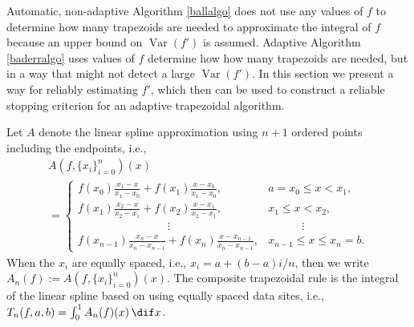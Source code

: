 \documentclass[]{article}
\DeclareMathOperator{\Var}{Var}
\theoremstyle{definition}
\theoremstyle{remark}
\newcommand{\datasites}{\{x_i\}_{i=0}^n}
\begin{document}
Automatic, non-adaptive Algorithm \ref{ballalgo} does not use any values of $f$ to determine how many trapezoids are needed to approximate the integral of $f$ because an upper bound on $\Var(f')$ is assumed.  Adaptive Algorithm \ref{baderralgo} uses values of $f$ determine how how many trapezoids are needed, but in a way that might not detect a large $\Var(f')$.  In this section we present a way for reliably estimating $f'$, which then can be used to construct a reliable stopping criterion for an adaptive trapezoidal algorithm.

Let $A$ denote the linear spline approximation using $n+1$ ordered points including the endpoints, i.e., 
\begin{multline}
\label{Andef}
A(f,\datasites)(x) \\
= \begin{cases}  \displaystyle f(x_0)\frac{x_1-x}{x_1-x_0} + f(x_1)\frac{x-x_0}{x_1-x_0}, & a=x_0 \le x < x_1, \\
\displaystyle f(x_1)\frac{x_2-x}{x_2-x_1} + f(x_2)\frac{x-x_1}{x_2-x_1}, & x_1 \le x < x_2, \\
\qquad \qquad \qquad \qquad \vdots & \qquad \quad \vdots \\
\displaystyle f(x_{n-1})\frac{x_n-x}{x_n-x_{n-1}} + f(x_n)\frac{x-x_{n-1}}{x_n-x_{n-1}}, & x_{n-1} \le x \le x_n=b.
\end{cases}
\end{multline}   
When the $x_i$ are equally spaced, i.e., $x_i=a+(b-a)i/n$, then we write $A_n(f):=A(f,\datasites)(x)$.  The composite trapezoidal rule is the integral of the linear spline based on using equally spaced data sites, i.e., $T_n(f,a,b) = \int_0^1 A_n(f)(x) \, \dif x$.  
\end{document}
